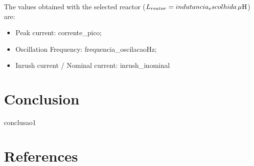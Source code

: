 \documentclass[a4paper]{article}
\begin{document}
	The values obtained with the selected reactor ($L_{reator} = {{indutancia_escolhida}} \, \mu \rm{H} $) are:
	\begin{itemize}[label=\textendash]
		\item Peak current: {{corrente_pico}};
		\item Oscillation Frequency: {{frequencia_oscilacao}}Hz;
		\item Inrush current / Nominal current: {{inrush_inominal}}
	\end{itemize}
	
	\section{Conclusion}
	{{conclusao1}}
	
	\section{References}
	
\end{document}
